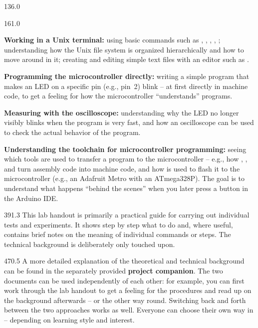 \documentclass{aslab}
\begin{document}
\maketitleblock

\begin{region}{136.0}
\end{region}

\begin{region}[pitch=13.3]{161.0}
\begin{dashlist}
\item \textbf{Working in a Unix terminal:} using basic commands such as
  , , , , ; understanding
  how the Unix file system is organized hierarchically and how to move
  around in it; creating and editing simple text files with an editor such
  as .
\item \textbf{Programming the microcontroller directly:} writing a simple
  program that makes an LED on a specific pin (e.g., pin~2) blink -- at
  first directly in machine code, to get a feeling for how the
  microcontroller ``understands'' programs.
\item \textbf{Measuring with the oscilloscope:} understanding why the LED no
  longer visibly blinks when the program is very fast, and how an
  oscilloscope can be used to check the actual behavior of the program.
\item \textbf{Understanding the toolchain for microcontroller programming:}
  seeing which tools are used to transfer a program to the microcontroller
  -- e.g., how , , and  turn
  assembly code into machine code, and how  is used to flash
  it to the microcontroller (e.g., an Adafruit Metro with an ATmega328P).
  The goal is to understand what happens ``behind the scenes'' when you
  later press a button in the Arduino IDE.
\end{dashlist}
\end{region}

\begin{region}[pitch=13.2]{391.3}
This lab handout is primarily a practical guide for carrying out individual
tests and experiments. It shows step by step what to do and, where useful,
contains brief notes on the meaning of individual commands or steps. The
technical background is deliberately only touched upon.
\end{region}

\begin{region}[pitch=13.3]{470.5}
A more detailed explanation of the theoretical and technical background can
be found in the separately provided \textbf{project companion}. The two
documents can be used independently of each other: for example, you can
first work through the lab handout to get a feeling for the procedures and
read up on the background afterwards -- or the other way round. Switching
back and forth between the two approaches works as well. Everyone can choose
their own way in -- depending on learning style and interest.
\end{region}
\end{document}

